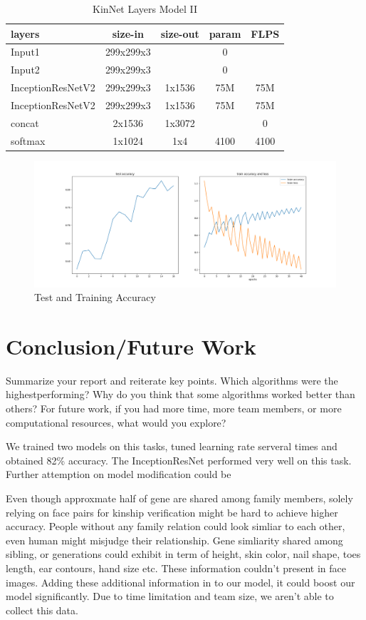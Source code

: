 \documentclass{article}
\begin{document}
\begin{table}[h]
	\centering
	\begin{tabular}{ | l | c | c | c | c |}
		\hline
		\textbf{layers}&\textbf{size-in}&\textbf{size-out}&\textbf{param}&\textbf{FLPS}\\
		\hline
			Input1 & 299x299x3 & & 0 & \\
			Input2 & 299x299x3 & & 0 & \\
			InceptionResNetV2 & 299x299x3 & 1x1536 & 75M & 75M \\
			InceptionResNetV2 & 299x299x3 & 1x1536 & 75M & 75M \\
			concat & 2x1536 & 1x3072 & & 0 \\
			softmax & 1x1024 & 1x4 & 4100 & 4100 \\
		\hline
	\end{tabular}
	\caption{KinNet Layers Model II}
	\label{table:3}
\end{table}


\begin{figure}[h]
	\caption{Test and Training Accuracy}
	\includegraphics[width=1\textwidth]{img/loss_accuracy}
	\centering
\end{figure}

\section{Conclusion/Future Work }
Summarize your report and reiterate key points. Which algorithms were the highestperforming?
Why do you think that some algorithms worked better than others? For
future work, if you had more time, more team members, or more computational resources,
what would you explore?

We trained two models on this tasks, tuned learning rate serveral times and obtained 82\% accuracy. The InceptionResNet performed very well on this task. Further attemption on model modification could be 

Even though approxmate half of gene are shared among family members, solely
relying on face pairs for kinship verification might be hard to achieve higher
accuracy. People without any family relation could look simliar to each other,
even human might misjudge their relationship. Gene simliarity shared among
sibling, or generations could exhibit in term of height, skin color, nail
shape, toes length, ear contours, hand size etc. These information couldn't
present in face images. Adding these additional information in to our model, it
could boost our model significantly. Due to time limitation and team size, we
aren't able to collect this data.
\end{document}
